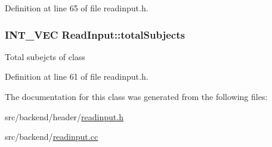 Definition at line 65 of file readinput.\-h.

\hypertarget{classReadInput_ad615390a3c9548b63e6081459801d3b3}{
\subsubsection[{total\-Subjects}]{\setlength{\rightskip}{0pt plus 5cm}I\-N\-T\-\_\-\-V\-E\-C Read\-Input\-::total\-Subjects\hspace{0.3cm}{\ttfamily [protected]}}}\label{classReadInput_ad615390a3c9548b63e6081459801d3b3}
Total subejcts of class 

Definition at line 61 of file readinput.\-h.



The documentation for this class was generated from the following files\-:\begin{DoxyCompactItemize}
\item 
src/backend/header/\hyperlink{readinput_8h}{readinput.\-h}\item 
src/backend/\hyperlink{readinput_8cc}{readinput.\-cc}\end{DoxyCompactItemize}
